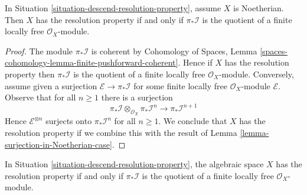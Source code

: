\begin{lemma}
\label{lemma-resolution-property-in-Noetherian-case}
In Situation \ref{situation-descend-resolution-property}, assume
$X$ is Noetherian. Then $X$ has the resolution property if and only
if $\pi_*\mathcal{I}$ is the quotient of a finite locally free
$\mathcal{O}_X$-module.
\end{lemma}

\begin{proof}
The module $\pi_*\mathcal{I}$ is coherent by
Cohomology of Spaces, Lemma
\ref{spaces-cohomology-lemma-finite-pushforward-coherent}.
Hence if $X$ has the resolution property then $\pi_*\mathcal{I}$
is the quotient of a finite locally free $\mathcal{O}_X$-module.
Conversely, assume given a surjection $\mathcal{E} \to \pi_*\mathcal{I}$
for some finite locally free $\mathcal{O}_X$-module $\mathcal{E}$.
Observe that for all $n \geq 1$ there is a surjection
$$
\pi_*\mathcal{I} \otimes_{\mathcal{O}_X} \pi_*\mathcal{I}^n
\longrightarrow
\pi_*\mathcal{I}^{n + 1}
$$
Hence $\mathcal{E}^{\otimes n}$ surjects onto
$\pi_*\mathcal{I}^n$ for all $n \geq 1$. We conclude that $X$
has the resolution property if we combine this with the
result of Lemma \ref{lemma-surjection-in-Noetherian-case}.
\end{proof}

\begin{lemma}
\label{lemma-resolution-property-one-sheaf}
In Situation \ref{situation-descend-resolution-property},
the algebraic space $X$ has the resolution property
if and only if $\pi_*\mathcal{I}$ is the quotient of a
finite locally free $\mathcal{O}_X$-module.
\end{lemma}

